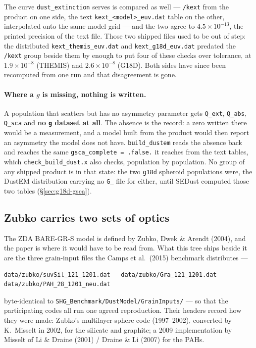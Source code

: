 \documentclass{my_memo}
\newcommand{\code}[1]{\texttt{#1}}
\begin{document}
The curve \code{dust\_extinction} serves is compared as well --- \code{/kext}
from the product on one side, the text \code{kext\_<model>\_euv.dat} table on
the other, interpolated onto the same model grid --- and the two agree to
$4.5\times10^{-13}$, the printed precision of the text file. Those two shipped
files used to be out of step: the distributed \code{kext\_themis\_euv.dat} and
\code{kext\_g18d\_euv.dat} predated the \code{/kext} group beside them by
enough to put four of these checks over tolerance, at $1.9\times10^{-8}$
(THEMIS) and $2.6\times10^{-8}$ (G18D). Both sides have since been recomputed
from one run and that disagreement is gone.

\paragraph{Where a $g$ is missing, nothing is written.} A population that
scatters but has no asymmetry parameter gets \code{Q\_ext}, \code{Q\_abs},
\code{Q\_sca} and \textbf{no \code{g} dataset at all}. The absence is the
record: a zero written there would be a measurement, and a model built from the
product would then report an asymmetry the model does not have.
\code{build\_dustem} reads the absence back and reaches the same
\code{gsca\_complete = .false.} it reaches from the text tables, which
\code{check\_build\_dust.x} also checks, population by population. No group of
any shipped product is in that state: the two \code{g18d} spheroid populations
were, the DustEM distribution carrying no \code{G\_} file for either, until
SEDust computed those two tables (\S\ref{sec:g18d-gsca}).

\subsection{Zubko carries two sets of optics}\label{sec:zubkooptics}

The ZDA BARE-GR-S model is defined by Zubko, Dwek \& Arendt (2004), and the
paper is where it would have to be read from. What this tree ships beside it
are the three grain-input files the Camps et al.\ (2015) benchmark
distributes ---

\begin{lstlisting}
data/zubko/suvSil_121_1201.dat   data/zubko/Gra_121_1201.dat
data/zubko/PAH_28_1201_neu.dat
\end{lstlisting}

\noindent byte-identical to \code{SHG\_Benchmark/DustModel/GrainInputs/} ---
so that the participating codes all run one agreed reproduction. Their headers
record how they were made: Zubko's multilayer-sphere code (1997--2002),
converted by K.~Misselt in 2002, for the silicate and graphite; a 2009
implementation by Misselt of Li \& Draine (2001) / Draine \& Li (2007) for the
PAHs.
\end{document}
